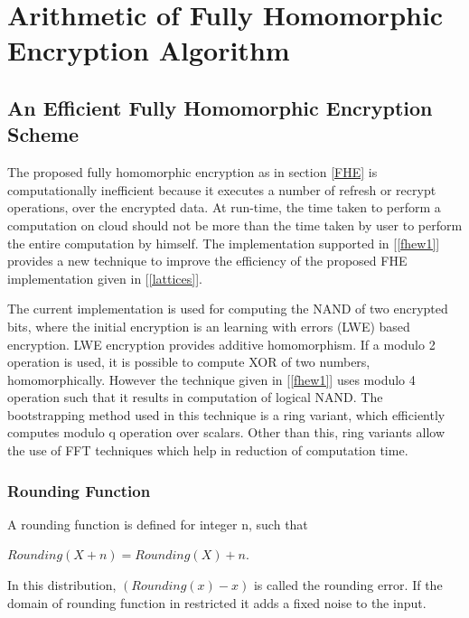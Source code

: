 \chapter{Arithmetic of Fully Homomorphic Encryption Algorithm}
\label{Chapter3}
\section{An Efficient Fully Homomorphic Encryption Scheme} \label{3.1}
The proposed fully homomorphic encryption as in section \ref{FHE} is computationally inefficient because it executes a number of refresh or recrypt operations, over the encrypted data. At run-time, the time taken to perform a computation on cloud should not be more than the time taken by user to perform the entire computation by himself. The implementation supported in [\ref{fhew1}] provides a new technique to improve the efficiency of the proposed FHE implementation given in [\ref{lattices}].

The current implementation is used for computing the NAND of two encrypted bits, where the initial encryption is an learning with errors (LWE) based encryption. LWE encryption provides additive homomorphism. If a modulo 2 operation is used, it is possible to compute XOR of two numbers, homomorphically. However the technique given in [\ref{fhew1}] uses modulo 4 operation such that it results in computation of logical NAND. The bootstrapping method used in this technique is a ring variant, which efficiently computes modulo q operation over scalars. Other than this, ring variants allow the use of FFT techniques which help in reduction of computation time.
\subsection{Rounding Function}\label{roundingf}
    A rounding  function is defined  for integer n, such that 
    
    \hspace{3cm} $Rounding(X+n)=Rounding(X)+n$.
    
    \noindent In this distribution, $(Rounding(x)-x)$ is called the rounding error. If the domain of rounding function in restricted it adds a fixed noise to the input. 

